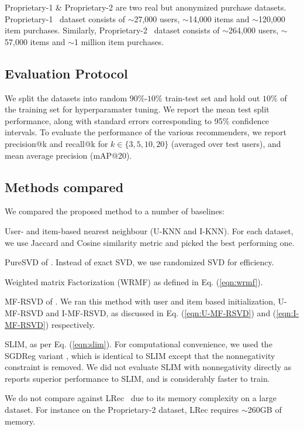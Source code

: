 \documentclass{article}
\newcommand{\citep}{\cite}
\newcommand{\citet}{\cite}
\newcommand{\Guitar}{{\sc Proprietary-1 }}
\newcommand{\Lowes}{{\sc Proprietary-2 }}
\begin{document}
\Guitar \& \Lowes  are two real but anonymized purchase datasets.
\Guitar \ dataset consists of $\sim$27,000 users, $\sim$14,000 items and $\sim$120,000 item purchases. Similarly, \Lowes \ dataset consists of $\sim$264,000 users, $\sim$57,000 items and $\sim$1 million item purchases.

\subsection{Evaluation Protocol}
We split the datasets into random $90\%$-$10\%$ train-test set and hold out $10\%$ of the training set for hyperparamater tuning. We report the mean test split performance, along with standard errors corresponding to 95\% confidence intervals.
To evaluate the performance of the various recommenders, we report \textsf{precision@k} and \textsf{recall@k} for $k \in \{ 3, 5, 10, 20 \}$ (averaged over test users), and mean average precision (mAP@20).


\subsection{Methods compared}

We compared the proposed method to a number of baselines:
\begin{compactitem}

	\item User- and item-based nearest neighbour (U-KNN and I-KNN). For each dataset, we use Jaccard and Cosine similarity metric and  picked the best performing one.

	\item PureSVD of \citet{Cremonesi:2010}. Instead of exact SVD, we use randomized SVD for efficiency.

	\item Weighted matrix Factorization (WRMF) as defined in Eq. (\ref{eqn:wrmf}).

	\item MF-RSVD of \citet{Tang:2013}.  We ran this method with user and item based initialization, U-MF-RSVD  and I-MF-RSVD, as discussed in Eq. (\ref{eqn:U-MF-RSVD}) and (\ref{eqn:I-MF-RSVD}) respectively.
	\item SLIM, as per Eq. (\ref{eqn:slim}). For computational convenience, we used the SGDReg variant \citep{Levy:2013}, which is identical to SLIM  except that the nonnegativity constraint is removed. We did not evaluate SLIM with nonnegativity directly as~\citet{Levy:2013} reports superior performance to SLIM, and is considerably faster to train.
\end{compactitem}
We do not compare against LRec~\citep{Sedhain:2016} due to its memory complexity on a large dataset. For instance on the \Lowes dataset, LRec requires $\sim$260GB of memory.
\end{document}

